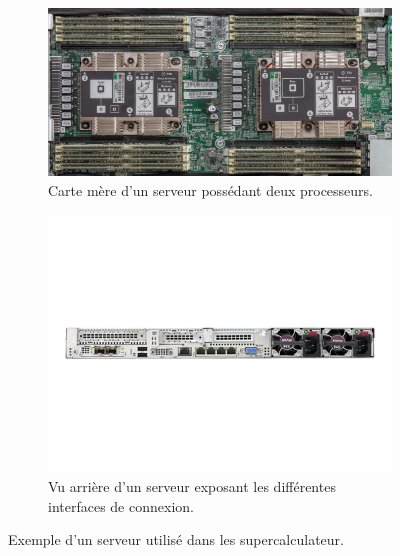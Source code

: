         
        
        \begin{figure}[t!]
            \centering
            \begin{subfigure}[t]{0.48\textwidth}
                \centering
                \includegraphics[width=.9\linewidth]{images/motherboard.jpg}
                \caption{\label{fig:motherboard}Carte mère d'un serveur possédant deux processeurs.}
            \end{subfigure}\hfill
        \begin{subfigure}[t]{0.48\textwidth}
                \centering
                \includegraphics[width=\linewidth]{images/dl360_back.jpg}
                \caption{Vu arrière d'un serveur exposant les différentes interfaces de connexion.\label{fig:dl360_back}}
            \end{subfigure}
            \caption{Exemple d'un serveur utilisé dans les supercalculateur.}
            \label{pic_pi_rect}
        \end{figure}
        
